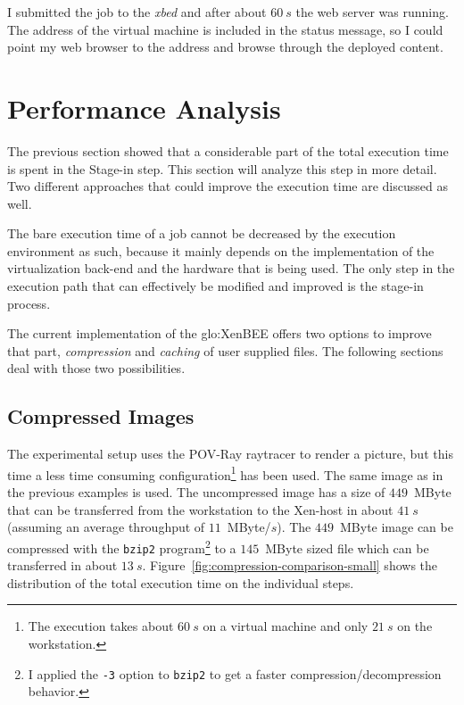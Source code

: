 I submitted  the job to  the \emph{xbed} and  after about $60\ s$  the web
server was running. The address of  the virtual machine is included in the
status message, so I could point  my web browser to the address and browse
through the deployed content.

\section{Performance Analysis}

The  previous  section  showed  that  a considerable  part  of  the  total
execution time  is spent in the  Stage-in step. This  section will analyze
this step in more detail.  Two different approaches that could improve the
execution time are discussed as well.

The bare  execution time  of a  job cannot be  decreased by  the execution
environment as  such, because it  mainly depends on the  implementation of
the virtualization back-end and the hardware that is being used.  The only
step in the  execution path that can effectively  be modified and improved
is the stage-in process.

The current  implementation of the \gls{glo:XenBEE} offers  two options to
improve that part, \emph{compression}  and \emph{caching} of user supplied
files.  The following sections deal with those two possibilities.

\subsection{Compressed Images}
\label{sec:compression}

The experimental setup uses the POV-Ray raytracer to render a picture, but
this time a less time consuming configuration\footnote{The execution takes
  about $60\ s$ on a virtual machine and only $21\ s$ on the workstation.}
has been used.   The same image as in the previous  examples is used.  The
uncompressed image has a size  of $449$~MByte that can be transferred from
the  workstation to the  Xen-host in  about $41\  s$ (assuming  an average
throughput of  $11$~MByte/$s$).  The  $449$~MByte image can  be compressed
with the \texttt{bzip2}  program\footnote{I applied the \texttt{-3} option
  to \texttt{bzip2}  to get a  faster compression/decompression behavior.}
to a  $145$~MByte sized file  which can be  transferred in about  $13\ s$.
Figure~\ref{fig:compression-comparison-small}  shows  the distribution  of
the total execution time on the individual steps.

